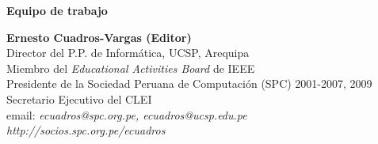 \begin{center}
{\bf \Huge Equipo de trabajo}
\end{center}
\vspace{1cm}

\begin{center}
\textbf{Ernesto Cuadros-Vargas (Editor)}\\
Director del P.P. de Informática, UCSP, Arequipa\\
Miembro del \textit{Educational Activities Board} de IEEE\\
Presidente de la Sociedad Peruana de Computación (SPC) 2001-2007, 2009\\
Secretario Ejecutivo del CLEI\\
email: \textit{ecuadros@spc.org.pe, ecuadros@ucsp.edu.pe}\\
\textit{http://socios.spc.org.pe/ecuadros}
\end{center}

\newpage

